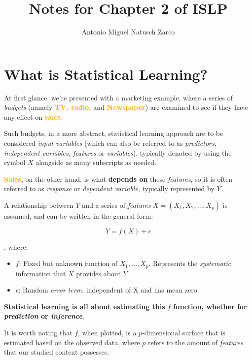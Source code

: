 \documentclass{article}
\title{Notes for Chapter 2 of ISLP}
\author{Antonio Miguel Natusch Zarco}
\theoremstyle{mytheoremstyle}
\theoremstyle{mytheoremstyle}
\theoremstyle{myproblemstyle}
\begin{document}
\maketitle
\section{What is Statistical Learning?}
At first glance, we're presented
with a marketing example, where
a series of \textit{budgets}
(namely \textbf{\textcolor{orange}{TV, radio,}}
and \textbf{\textcolor{orange}{Newspaper}})
are examined to see if they have any effect on
\textbf{\textcolor{orange}{sales.}}

Such budgets, in a more abstract, statistical learning approach
are to be considered \textit{input variables}
(which can also be referred to as \textit{predictors, independent variables,
	features} or \textit{variables}), typically denoted by using the
symbol $X$ alongside as many subscripts as needed.

\textbf{\textcolor{orange}{Sales}}, on the other hand,
is what \textbf{depends on} these \textit{features},
so it is often referred to as \textit{response}
or \textit{dependent variable}, typically
represented by $Y$

A relationship between $Y$ and a series of \textit{features}
$X = (X_1, X_2, \dots, X_p)$ is assumed,
and can be written in the general form:

\begin{equation}
	Y = f(X) + \epsilon
\end{equation}

, where:

\begin{itemize}
	\item $f$: Fixed but unknown function of $X_1, \dots, X_p$.
	      Represents the \textit{systematic} information that $X$
	      provides about $Y$.
	\item $\epsilon$: Random \textit{error term}, independent of X and
	      has mean zero.
\end{itemize}

\begin{center}
	\textbf{Statistical learning is all about estimating this}
	$f$ \textbf{function, whether for \textit{prediction}
		or \textit{inference}}.
\end{center}

It is worth noting that $f$, when plotted,
is a $p$-dimensional surface that is estimated
based on the observed data,
where $p$ refers to the amount of \textit{features}
that our studied context possesses.
\end{document}

